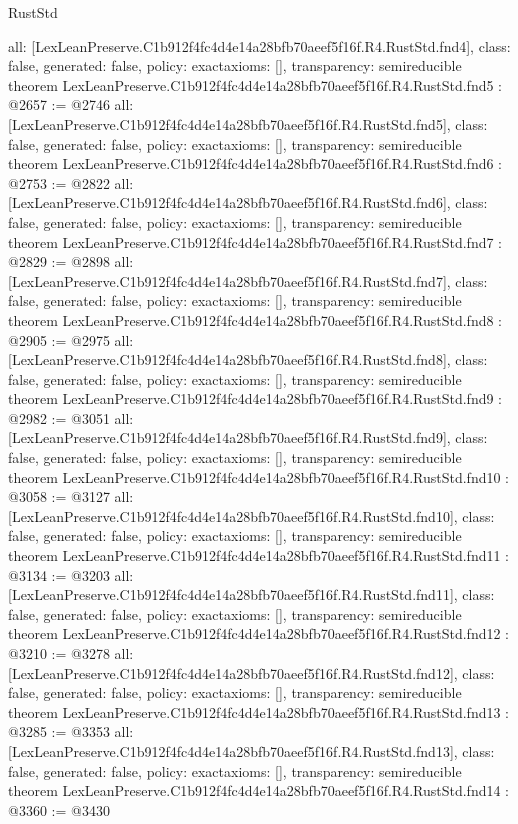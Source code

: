 \begin{lexlean}{RustStd}
\begin{coremodule}
{  all: [LexLeanPreserve.C1b912f4fc4d4e14a28bfb70aeef5f16f.R4.RustStd.fnd4],
  class: false,
  generated: false,
  policy: exact{axioms: []},
  transparency: semireducible
}
theorem LexLeanPreserve.C1b912f4fc4d4e14a28bfb70aeef5f16f.R4.RustStd.fnd5 : @2657 := @2746 {
  all: [LexLeanPreserve.C1b912f4fc4d4e14a28bfb70aeef5f16f.R4.RustStd.fnd5],
  class: false,
  generated: false,
  policy: exact{axioms: []},
  transparency: semireducible
}
theorem LexLeanPreserve.C1b912f4fc4d4e14a28bfb70aeef5f16f.R4.RustStd.fnd6 : @2753 := @2822 {
  all: [LexLeanPreserve.C1b912f4fc4d4e14a28bfb70aeef5f16f.R4.RustStd.fnd6],
  class: false,
  generated: false,
  policy: exact{axioms: []},
  transparency: semireducible
}
theorem LexLeanPreserve.C1b912f4fc4d4e14a28bfb70aeef5f16f.R4.RustStd.fnd7 : @2829 := @2898 {
  all: [LexLeanPreserve.C1b912f4fc4d4e14a28bfb70aeef5f16f.R4.RustStd.fnd7],
  class: false,
  generated: false,
  policy: exact{axioms: []},
  transparency: semireducible
}
theorem LexLeanPreserve.C1b912f4fc4d4e14a28bfb70aeef5f16f.R4.RustStd.fnd8 : @2905 := @2975 {
  all: [LexLeanPreserve.C1b912f4fc4d4e14a28bfb70aeef5f16f.R4.RustStd.fnd8],
  class: false,
  generated: false,
  policy: exact{axioms: []},
  transparency: semireducible
}
theorem LexLeanPreserve.C1b912f4fc4d4e14a28bfb70aeef5f16f.R4.RustStd.fnd9 : @2982 := @3051 {
  all: [LexLeanPreserve.C1b912f4fc4d4e14a28bfb70aeef5f16f.R4.RustStd.fnd9],
  class: false,
  generated: false,
  policy: exact{axioms: []},
  transparency: semireducible
}
theorem LexLeanPreserve.C1b912f4fc4d4e14a28bfb70aeef5f16f.R4.RustStd.fnd10 : @3058 := @3127 {
  all: [LexLeanPreserve.C1b912f4fc4d4e14a28bfb70aeef5f16f.R4.RustStd.fnd10],
  class: false,
  generated: false,
  policy: exact{axioms: []},
  transparency: semireducible
}
theorem LexLeanPreserve.C1b912f4fc4d4e14a28bfb70aeef5f16f.R4.RustStd.fnd11 : @3134 := @3203 {
  all: [LexLeanPreserve.C1b912f4fc4d4e14a28bfb70aeef5f16f.R4.RustStd.fnd11],
  class: false,
  generated: false,
  policy: exact{axioms: []},
  transparency: semireducible
}
theorem LexLeanPreserve.C1b912f4fc4d4e14a28bfb70aeef5f16f.R4.RustStd.fnd12 : @3210 := @3278 {
  all: [LexLeanPreserve.C1b912f4fc4d4e14a28bfb70aeef5f16f.R4.RustStd.fnd12],
  class: false,
  generated: false,
  policy: exact{axioms: []},
  transparency: semireducible
}
theorem LexLeanPreserve.C1b912f4fc4d4e14a28bfb70aeef5f16f.R4.RustStd.fnd13 : @3285 := @3353 {
  all: [LexLeanPreserve.C1b912f4fc4d4e14a28bfb70aeef5f16f.R4.RustStd.fnd13],
  class: false,
  generated: false,
  policy: exact{axioms: []},
  transparency: semireducible
}
theorem LexLeanPreserve.C1b912f4fc4d4e14a28bfb70aeef5f16f.R4.RustStd.fnd14 : @3360 := @3430 {
}
\end{coremodule}
\end{lexlean}
